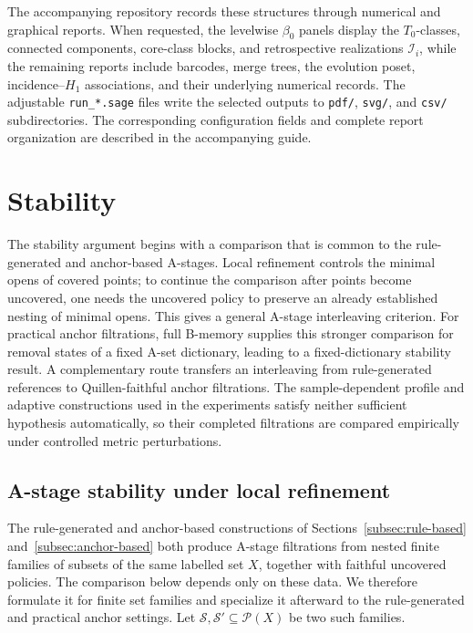 \documentclass[a4paper,11pt]{article}
\theoremstyle{definition}
\theoremstyle{remark}
\begin{document}
The accompanying repository records these structures through numerical and graphical reports. When requested, the levelwise $\beta_0$ panels display the $T_0$-classes, connected components, core-class blocks, and retrospective realizations $\mathcal I_i$, while the remaining reports include barcodes, merge trees, the evolution poset, incidence--$H_1$ associations, and their underlying numerical records. The adjustable \nolinkurl{run_*.sage} files write the selected outputs to \nolinkurl{pdf/}, \nolinkurl{svg/}, and \nolinkurl{csv/} subdirectories. The corresponding configuration fields and complete report organization are described in the accompanying guide.




\section{Stability}
\label{sec:stability}

The stability argument begins with a comparison that is common to the rule-generated and anchor-based A-stages. Local refinement controls the minimal opens of covered points; to continue the comparison after points become uncovered, one needs the uncovered policy to preserve an already established nesting of minimal opens. This gives a general A-stage interleaving criterion. For practical anchor filtrations, full B-memory supplies this stronger comparison for removal states of a fixed A-set dictionary, leading to a fixed-dictionary stability result. A complementary route transfers an interleaving from rule-generated references to Quillen-faithful anchor filtrations. The sample-dependent profile and adaptive constructions used in the experiments satisfy neither sufficient hypothesis automatically, so their completed filtrations are compared empirically under controlled metric perturbations.

\subsection{A-stage stability under local refinement}
\label{subsec:rule-refinement-stability}

The rule-generated and anchor-based constructions of Sections~\ref{subsec:rule-based} and~\ref{subsec:anchor-based} both produce A-stage filtrations from nested finite families of subsets of the same labelled set $X$, together with faithful uncovered policies. The comparison below depends only on these data. We therefore formulate it for finite set families and specialize it afterward to the rule-generated and practical anchor settings. Let $\mathcal S,\mathcal S'\subseteq\mathcal P(X)$ be two such families.
\end{document}
